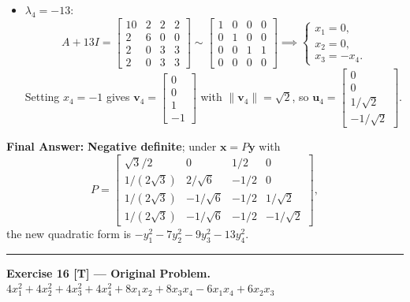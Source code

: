 \documentclass[11pt, letterpaper]{article}
\theoremstyle{definition}
\theoremstyle{remark}
\begin{document}
\begin{itemize}
    \item $\lambda_4 = -13$:
    \[
    A + 13I = \begin{bmatrix} 10 & 2 & 2 & 2 \\ 2 & 6 & 0 & 0 \\ 2 & 0 & 3 & 3 \\ 2 & 0 & 3 & 3 \end{bmatrix} \sim \begin{bmatrix} 1 & 0 & 0 & 0 \\ 0 & 1 & 0 & 0 \\ 0 & 0 & 1 & 1 \\ 0 & 0 & 0 & 0 \end{bmatrix} \implies \begin{cases} x_1 = 0, \\ x_2 = 0, \\ x_3 = -x_4. \end{cases}
    \]
    Setting $x_4 = -1$ gives $\mathbf{v}_4 = \begin{bmatrix} 0 \\ 0 \\ 1 \\ -1 \end{bmatrix}$ with $\|\mathbf{v}_4\| = \sqrt{2}$, so $\mathbf{u}_4 = \begin{bmatrix} 0 \\ 0 \\ 1/\sqrt{2} \\ -1/\sqrt{2} \end{bmatrix}$.
\end{itemize}

\textbf{Final Answer:} \textbf{Negative definite}; under $\mathbf{x} = P\mathbf{y}$ with
\[
P = \begin{bmatrix}
\sqrt{3}/2 & 0 & 1/2 & 0 \\[2pt]
1/(2\sqrt{3}) & 2/\sqrt{6} & -1/2 & 0 \\[2pt]
1/(2\sqrt{3}) & -1/\sqrt{6} & -1/2 & 1/\sqrt{2} \\[2pt]
1/(2\sqrt{3}) & -1/\sqrt{6} & -1/2 & -1/\sqrt{2}
\end{bmatrix},
\]
the new quadratic form is $-y_1^2 - 7y_2^2 - 9y_3^2 - 13y_4^2$.

\medskip
\hrule
\medskip

\textbf{Exercise 16 [T] --- Original Problem.} $4x_1^2 + 4x_2^2 + 4x_3^2 + 4x_4^2 + 8x_1x_2 + 8x_3x_4 - 6x_1x_4 + 6x_2x_3$
\end{document}
